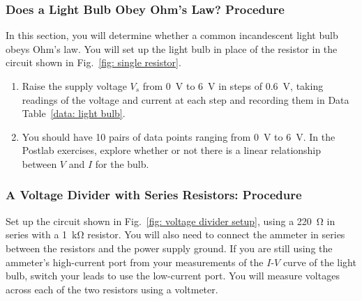 \documentclass[addpoints]{physlabs}
\begin{document}
\begin{labsection}
\begin{experiment}
\subsubsection*{Does a Light Bulb Obey Ohm's Law? Procedure}

In this section, you will determine whether a common incandescent light bulb obeys Ohm's law. You will set up the light bulb in place of the resistor in the circuit shown in Fig.~\ref{fig: single resistor}.

\begin{center}
\setlength{\fboxsep}{6pt}%
\setlength{\fboxrule}{2pt}%
\end{center}

\begin{enumerate}
    \item Raise the supply voltage $V_s$ from \qty{0}{\volt} to \qty{6}{\volt} in steps of \qty{0.6}{\volt}, taking readings of the voltage and current at each step and recording them in Data Table~\ref{data: light bulb}.
    
    \item You should have 10 pairs of data points ranging from \qty{0}{\volt} to \qty{6}{\volt}. In the Postlab exercises, explore whether or not there is a linear relationship between $V$ and $I$ for the bulb.
\end{enumerate}

\subsubsection*{A Voltage Divider with Series Resistors: Procedure}

Set up the circuit shown in Fig.~\ref{fig: voltage divider setup}, using a \qty{220}{\ohm} in series with a \qty{1}{\kilo\ohm} resistor. You will also need to connect the ammeter in series between the resistors and the power supply ground. If you are still using the ammeter's high-current port from your measurements of the $I$-$V$ curve of the light bulb, switch your leads to use the low-current port. You will measure voltages across each of the two resistors using a voltmeter.


\end{experiment}
\end{labsection}
\end{document}
